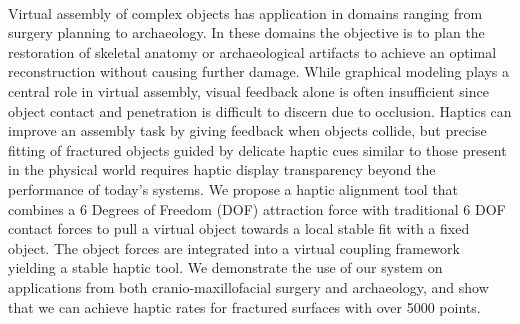 {{{\begin{enumerate}
\\ \aabstract
Virtual assembly of complex objects has application in domains ranging from surgery planning to archaeology. In these domains the objective is to plan the restoration of skeletal anatomy or archaeological artifacts to achieve an optimal reconstruction without causing further damage. While graphical modeling plays a central role in virtual assembly, visual feedback alone is often insufficient since object contact and penetration is difficult to discern due to occlusion. Haptics can improve an assembly task by giving feedback when objects collide, but precise fitting of fractured objects guided by delicate haptic cues similar to those present in the physical world requires haptic display transparency beyond the performance of today's systems. We propose a haptic alignment tool that combines a 6 Degrees of Freedom (DOF) attraction force with traditional 6 DOF contact forces to pull a virtual object towards a local stable fit with a fixed object. The object forces are integrated into a virtual coupling framework yielding a stable haptic tool. We demonstrate the use of our system on applications from both cranio-maxillofacial surgery and archaeology, and show that we can achieve haptic rates for fractured surfaces with over 5000 points.


\end{enumerate}}}}
